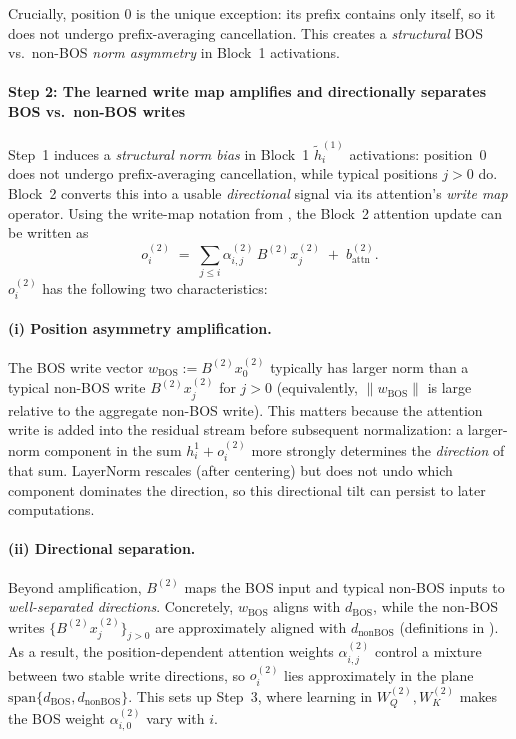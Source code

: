 \documentclass{article}
\theoremstyle{plain}
\theoremstyle{definition}
\theoremstyle{remark}
\begin{document}
Crucially, position $0$ is the unique exception: its prefix contains only itself, so it does not undergo prefix-averaging cancellation.
This creates a \emph{structural} BOS vs.\ non-BOS \emph{norm asymmetry} in Block~1 activations. %

\paragraph{Step 2: The learned write map amplifies and directionally separates BOS vs.\ non-BOS writes}
\label{subsec:mech_step2}

Step~1 induces a \emph{structural norm bias} in Block~1 $\tilde h_i^{(1)}$ activations: position~0 does not undergo prefix-averaging cancellation, while typical positions $j>0$ do.
Block~2 converts this into a usable \emph{directional} signal via its attention's \textit{write map} operator.
Using the write-map notation from , the Block~2 attention update can be written as
\begin{equation}
o_i^{(2)} \;=\; \sum_{j\le i}\alpha_{i,j}^{(2)}\, B^{(2)} x_j^{(2)} \;+\; b_{\text{attn}}^{(2)}.
\label{eq:mech_step2_attnwrite}
\end{equation}
$o_i^{(2)}$ has the following two characteristics:
\setlength{\parskip}{0pt}

\paragraph{(i) Position asymmetry amplification.}
The BOS write vector $w_{\text{BOS}}:=B^{(2)}x_0^{(2)}$ typically has larger norm than a typical non-BOS write $B^{(2)}x_j^{(2)}$ for $j>0$ (equivalently, $\|w_{\text{BOS}}\|$ is large relative to the aggregate non-BOS write).
This matters because the attention write is added into the residual stream before subsequent normalization:
a larger-norm component in the sum $h_i^1 + o_i^{(2)}$ more strongly determines the \emph{direction} of that sum.
LayerNorm rescales (after centering) but does not undo which component dominates the direction, so this directional tilt can persist to later computations.
\setlength{\parskip}{0pt}
\paragraph{(ii) Directional separation.}
Beyond amplification, $B^{(2)}$ maps the BOS input and typical non-BOS inputs to \emph{well-separated directions}.
Concretely, $w_{\text{BOS}}$ aligns with $d_{\text{BOS}}$, while the non-BOS writes $\{B^{(2)}x_j^{(2)}\}_{j>0}$ are approximately aligned with $d_{\text{nonBOS}}$ (definitions in ).
As a result, the position-dependent attention weights $\alpha_{i,j}^{(2)}$ control a mixture between two stable write directions,
so $o_i^{(2)}$ lies approximately in the plane $\mathrm{span}\{d_{\text{BOS}}, d_{\text{nonBOS}}\}$.
This sets up Step~3, where learning in $W_Q^{(2)},W_K^{(2)}$ makes the BOS weight $\alpha_{i,0}^{(2)}$ vary with $i$.
\end{document}
